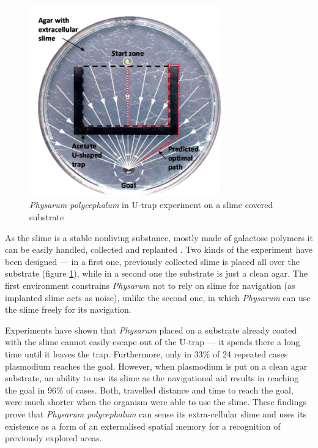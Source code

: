\documentclass[english,a4paper,twoside]{ppfcmthesis}
\begin{document}
\begin{figure}
  \centering
  \includegraphics[width=0.74\textwidth]{background/physarum/trap_experiment.jpg}
  \caption{\textit{Physarum polycephalum} in U-trap experiment on a slime covered substrate \cite{reid2012slime}}
  \label{figure:bp_trap_experiment}
\end{figure}

As the slime is a stable nonliving substance, mostly made of galactose polymers it can be easily handled, collected and replanted \cite{mccormick1970isolation}. Two kinds of the experiment have been designed --- in a first one, previously collected slime is placed all over the substrate (figure \ref{figure:bp_trap_experiment}), while in a second one the substrate is just a clean agar. The first environment constrains \textit{Physarum} not to rely on slime for navigation (as implanted slime acts as noise), unlike the second one, in which \textit{Physarum} can use the slime freely for its navigation.

Experiments have shown that \textit{Physarum} placed on a substrate already coated with the slime cannot easily escape out of the U-trap --- it spends there a long time until it leaves the trap. Furthermore, only in 33\% of 24 repeated cases plasmodium reaches the goal. However, when plasmodium is put on a clean agar substrate, an ability to use its slime as the navigational aid results in reaching the goal in 96\% of cases. Both, travelled distance and time to reach the goal, were much shorter when the organism were able to use the slime. These findings prove that \textit{Physarum polycephalum} can sense its extra-cellular slime and uses its existence as a form of an externalised spatial memory for a recognition of previously explored areas.
\end{document}

